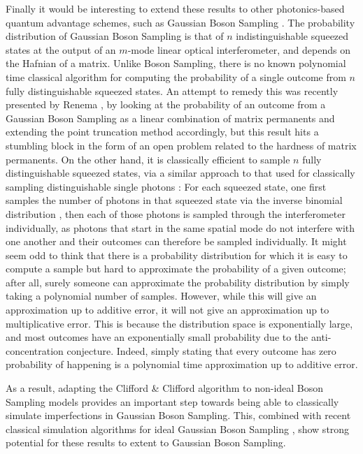 Finally it would be interesting to extend these results to other photonics-based quantum advantage schemes, such as Gaussian Boson Sampling \cite{hamilton2017}. The probability distribution of Gaussian Boson Sampling is that of $n$ indistinguishable squeezed states at the output of an $m$-mode linear optical interferometer, and depends on the Hafnian of a matrix. Unlike Boson Sampling, there is no known polynomial time classical algorithm for computing the probability of a single outcome from $n$ fully distinguishable squeezed states. An attempt to remedy this was recently presented by Renema \cite{renema2019}, by looking at the probability of an outcome from a Gaussian Boson Sampling as a linear combination of matrix permanents and extending the point truncation method accordingly, but this result hits a stumbling block in the form of an open problem related to the hardness of matrix permanents. On the other hand, it is classically efficient to sample $n$ fully distinguishable squeezed states, via a similar approach to that used for classically sampling distinguishable single photons \cite{aaronson2014}: For each squeezed state, one first samples the number of photons in that squeezed state via the inverse binomial distribution \cite{wu2019}, then each of those photons is sampled through the interferometer individually, as photons that start in the same spatial mode do not interfere with one another and their outcomes can therefore be sampled individually. It might seem odd to think that there is a probability distribution for which it is easy to compute a sample but hard to approximate the probability of a given outcome; after all, surely someone can approximate the probability distribution by simply taking a polynomial number of samples. However, while this will give an approximation up to additive error, it will not give an approximation up to multiplicative error. This is because the distribution space is exponentially large, and most outcomes have an exponentially small probability due to the anti-concentration conjecture. Indeed, simply stating that every outcome has zero probability of happening is a polynomial time approximation up to additive error.

As a result, adapting the Clifford \& Clifford algorithm to non-ideal Boson Sampling models provides an important step towards being able to classically simulate imperfections in Gaussian Boson Sampling. This, combined with recent classical simulation algorithms for ideal Gaussian Boson Sampling \cite{quesada2019, wu2019}, show strong potential for these results to extent to Gaussian Boson Sampling.


